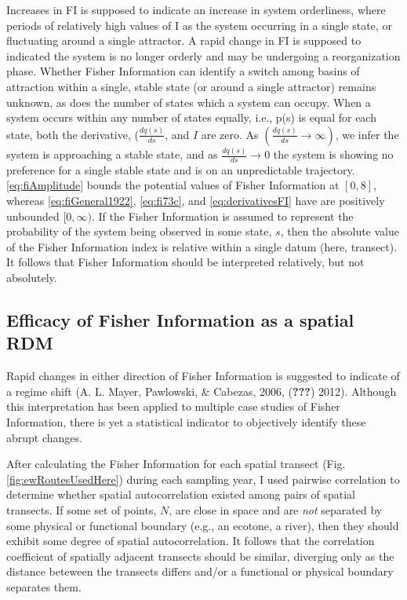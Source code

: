 \documentclass[12pt,twoside,openany]{reedthesis}
\begin{document}
Increases in FI is supposed to indicate an increase in system
orderliness, where periods of relatively high values of I as the system
occurring in a single state, or fluctuating around a single attractor. A
rapid change in FI is supposed to indicated the system is no longer
orderly and may be undergoing a reorganization phase. Whether Fisher
Information can identify a switch among basins of attraction within a
single, stable state (or around a single attractor) remains unknown, as
does the number of states which a system can occupy. When a system
occurs within any number of states equally, i.e., p(s) is equal for each
state, both the derivative, (\(\frac{dq(s)}{ds}\), and \(I\) are zero.
As \((\frac{dq(s)}{ds} \rightarrow \infty)\), we infer the system is
approaching a stable state, and as \(\frac{dq(s)}{ds} \rightarrow 0\)
the system is showing no preference for a single stable state and is on
an unpredictable trajectory. \eqref{eq:fiAmplitude} bounds the potential
values of Fisher Information at \([0, 8]\), whereas
\eqref{eq:fiGeneral1922}, \eqref{eq:fi73c}, and \eqref{eq:derivativesFI} have
are positively unbounded \([0, \infty)\). If the Fisher Information is
assumed to represent the probability of the system being observed in
some state, \(s\), then the absolute value of the Fisher Information
index is relative within a single datum (here, transect). It follows
that Fisher Information should be interpreted relatively, but not
absolutely.

\subsection{Efficacy of Fisher Information as a spatial
RDM}\label{efficacy-of-fisher-information-as-a-spatial-rdm}

Rapid changes in either direction of Fisher Information is suggested to
indicate of a regime shift (A. L. Mayer, Pawlowski, \& Cabezas, 2006,
({\textbf{???}}) 2012). Although this interpretation has been applied to
multiple case studies of Fisher Information, there is yet a statistical
indicator to objectively identify these abrupt changes.

After calculating the Fisher Information for each spatial transect (Fig.
\ref{fig:ewRoutesUsedHere}) during each sampling year, I used pairwise
correlation to determine whether spatial autocorrelation existed among
pairs of spatial transects. If some set of points, \(N\), are close in
space and are \emph{not} separated by some physical or functional
boundary (e.g., an ecotone, a river), then they should exhibit some
degree of spatial autocorrelation. It follows that the correlation
coefficient of spatially adjacent transects should be similar, diverging
only as the distance beteween the transects differs and/or a functional
or physical boundary separates them.
\end{document}
